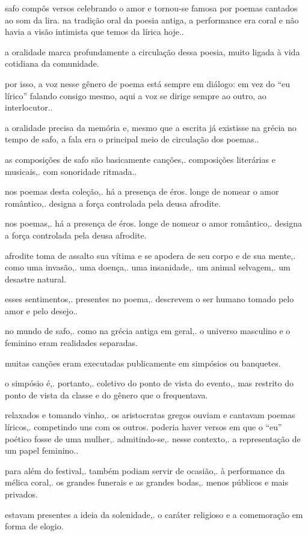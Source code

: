 \documentclass[12pt]{extarticle}
\begin{document}
safo compôs versos celebrando o amor e tornou-se famosa por poemas
cantados ao som da lira. na tradição oral da poesia antiga, a
performance era coral e não havia a visão intimista que temos da lírica
hoje..

a oralidade marca profundamente a circulação dessa poesia, muito ligada
à vida cotidiana da comunidade.

por isso, a voz nesse gênero de poema está sempre em diálogo: em vez do
``eu lírico'' falando consigo mesmo, aqui a voz se dirige sempre ao
outro, ao interlocutor..

a oralidade precisa da memória e, mesmo que a escrita já existisse na
grécia no tempo de safo, a fala era o principal meio de circulação dos
poemas..

as composições de safo são basicamente canções,. composições literárias
e musicais,. com sonoridade ritmada..

nos poemas desta coleção,. há a presença de éros. longe de nomear o amor
romântico,. designa a força controlada pela deusa afrodite.

nos poemas,. há a presença de éros. longe de nomear o amor romântico,.
designa a força controlada pela deusa afrodite.


afrodite toma de assalto sua vítima e se apodera de seu corpo e de sua
mente,. como uma invasão,. uma doença,. uma insanidade,. um animal
selvagem,. um desastre natural.


esses sentimentos,. presentes no poema,. descrevem o ser humano tomado
pelo amor e pelo desejo..


no mundo de safo,. como na grécia antiga em geral,. o universo masculino
e o feminino eram realidades separadas.


muitas canções eram executadas publicamente em simpósios ou banquetes.


o simpósio é,. portanto,. coletivo do ponto de vista do evento,. mas
restrito do ponto de vista da classe e do gênero que o frequentava.


relaxados e tomando vinho,. os aristocratas gregos ouviam e cantavam
poemas líricos,. competindo uns com os outros. poderia haver versos em
que o ``eu'' poético fosse de uma mulher,. admitindo-se,. nesse
contexto,. a representação de um papel feminino..

para além do festival,. também podiam servir de ocasião,. à performance
da mélica coral,. os grandes funerais e as grandes bodas,. menos
públicos e mais privados.


estavam presentes a ideia da solenidade,. o caráter religioso e a
comemoração em forma de elogio.
\end{document}
